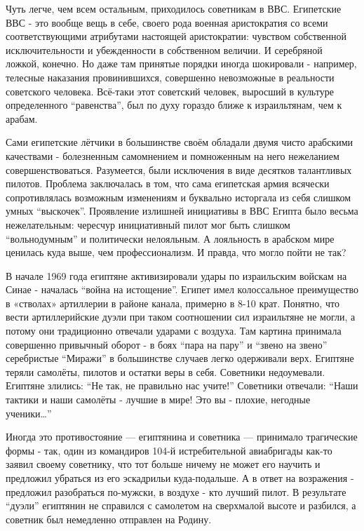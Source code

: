 Чуть легче, чем всем остальным, приходилось советникам в ВВС. Египетские ВВС - это вообще вещь в себе, своего рода военная аристократия со всеми соответствующими атрибутами настоящей аристократии: чувством собственной исключительности и убежденности в собственном величии. И серебряной ложкой, конечно. Но даже там принятые порядки иногда шокировали - например, телесные наказания провинившихся, совершенно невозможные в реальности советского человека. Всё-таки этот советский человек, выросший в культуре определенного “равенства”, был по духу гораздо ближе к израильтянам, чем к арабам.

Сами египетские лётчики в большинстве своём обладали двумя чисто арабскими качествами - болезненным самомнением и помноженным на него нежеланием совершенствоваться. Разумеется, были исключения в виде десятков талантливых пилотов. Проблема заключалась в том, что сама египетская армия всячески сопротивлялась возможным изменениям и буквально исторгала из себя слишком умных “выскочек”. Проявление излишней инициативы в ВВС Египта было весьма нежелательным: чересчур инициативный пилот мог быть слишком “вольнодумным” и политически нелояльным. А лояльность в арабском мире ценилась куда выше, чем профессионализм. И правда, что могло пойти не так?

В начале 1969 года египтяне активизировали удары по израильским войскам на Синае - началась “война на истощение”. Египет имел колоссальное преимущество в «стволах» артиллерии в районе канала, примерно в 8-10 крат. Понятно, что вести артиллерийские дуэли при таком соотношении сил израильтяне не могли, а потому они традиционно отвечали ударами с воздуха. Там картина принимала совершенно привычный оборот - в боях “пара на пару” и “звено на звено” серебристые “Миражи” в большинстве случаев легко одерживали верх. Египтяне теряли самолёты, пилотов и остатки веры в себя. Советники недоумевали. Египтяне злились: “Не так, не правильно нас учите!” Советники отвечали: “Наши тактики и наши самолёты - лучшие в мире! Это вы - плохие, негодные ученики…”

Иногда это противостояние — египтянина и советника — принимало трагические формы - так, один из командиров 104-й истребительной авиабригады как-то заявил своему советнику, что тот больше ничему не может его научить и предложил убраться из его эскадрильи куда-подальше. А в ответ на возражения - предложил разобраться по-мужски, в воздухе - кто лучший пилот. В результате “дуэли” египтянин не справился с самолетом на сверхмалой высоте и разбился, а советник был немедленно отправлен на Родину.

